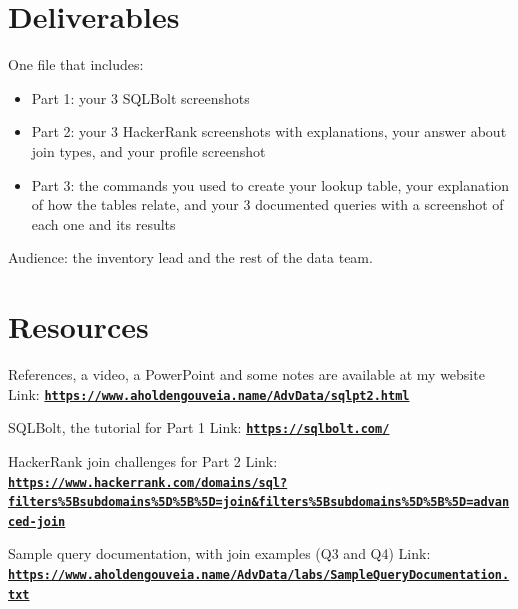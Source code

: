 \documentclass[12pt]{article}
\begin{document}
\section*{Deliverables}
One file that includes:
\begin{itemize}
    \item Part 1: your 3 SQLBolt screenshots
    \item Part 2: your 3 HackerRank screenshots with explanations, your answer about join types, and your profile screenshot
    \item Part 3: the commands you used to create your lookup table, your explanation of how the tables relate, and your 3 documented queries with a screenshot of each one and its results
\end{itemize}

Audience: the inventory lead and the rest of the data team.

\section*{Resources}
References, a video, a PowerPoint and some notes are available at my website
Link: \href{https://www.aholdengouveia.name/AdvData/sqlpt2.html}{\textbf{\nolinkurl{https://www.aholdengouveia.name/AdvData/sqlpt2.html}}}

SQLBolt, the tutorial for Part 1
Link: \href{https://sqlbolt.com/}{\textbf{\nolinkurl{https://sqlbolt.com/}}}

HackerRank join challenges for Part 2
Link: \href{https://www.hackerrank.com/domains/sql?filters%5Bsubdomains%5D%5B%5D=join&filters%5Bsubdomains%5D%5B%5D=advanced-join}{\textbf{\nolinkurl{https://www.hackerrank.com/domains/sql?filters\%5Bsubdomains\%5D\%5B\%5D=join&filters\%5Bsubdomains\%5D\%5B\%5D=advanced-join}}}

Sample query documentation, with join examples (Q3 and Q4)
Link: \href{https://www.aholdengouveia.name/AdvData/labs/SampleQueryDocumentation.txt}{\textbf{\nolinkurl{https://www.aholdengouveia.name/AdvData/labs/SampleQueryDocumentation.txt}}}
\end{document}
